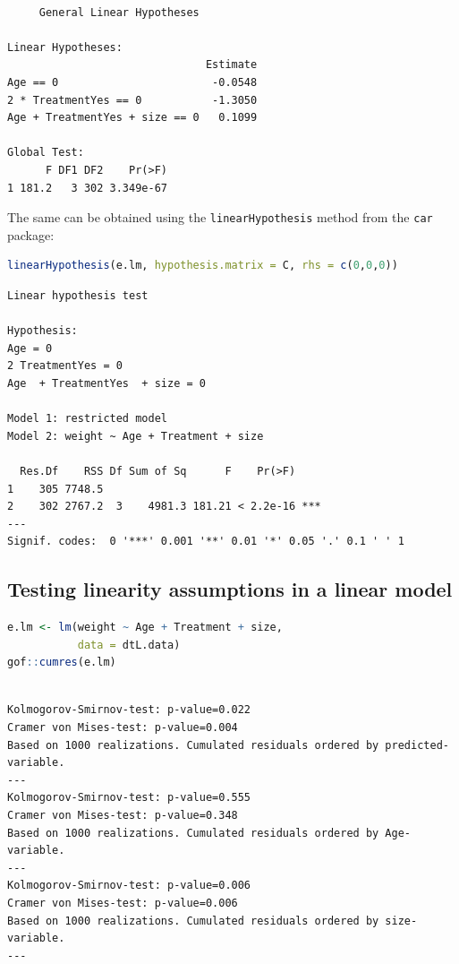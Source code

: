 \documentclass{article}
\begin{document}
\label{}
\begin{verbatim}

	 General Linear Hypotheses

Linear Hypotheses:
                               Estimate
Age == 0                        -0.0548
2 * TreatmentYes == 0           -1.3050
Age + TreatmentYes + size == 0   0.1099

Global Test:
      F DF1 DF2    Pr(>F)
1 181.2   3 302 3.349e-67
\end{verbatim}

The same can be obtained using the \texttt{linearHypothesis} method from the \texttt{car} package:
\begin{lstlisting}[language=r,numbers=none]
linearHypothesis(e.lm, hypothesis.matrix = C, rhs = c(0,0,0))
\end{lstlisting}

\label{}
\begin{verbatim}
Linear hypothesis test

Hypothesis:
Age = 0
2 TreatmentYes = 0
Age  + TreatmentYes  + size = 0

Model 1: restricted model
Model 2: weight ~ Age + Treatment + size

  Res.Df    RSS Df Sum of Sq      F    Pr(>F)    
1    305 7748.5                                  
2    302 2767.2  3    4981.3 181.21 < 2.2e-16 ***
---
Signif. codes:  0 '***' 0.001 '**' 0.01 '*' 0.05 '.' 0.1 ' ' 1
\end{verbatim}
\subsection{Testing linearity assumptions in a linear model}
\label{sec:orgb93e2d6}
\begin{lstlisting}[language=r,numbers=none]
e.lm <- lm(weight ~ Age + Treatment + size,
           data = dtL.data)
gof::cumres(e.lm) 
\end{lstlisting}

\label{}
\begin{verbatim}

Kolmogorov-Smirnov-test: p-value=0.022
Cramer von Mises-test: p-value=0.004
Based on 1000 realizations. Cumulated residuals ordered by predicted-variable.
---
Kolmogorov-Smirnov-test: p-value=0.555
Cramer von Mises-test: p-value=0.348
Based on 1000 realizations. Cumulated residuals ordered by Age-variable.
---
Kolmogorov-Smirnov-test: p-value=0.006
Cramer von Mises-test: p-value=0.006
Based on 1000 realizations. Cumulated residuals ordered by size-variable.
---
\end{verbatim}
\end{document}
